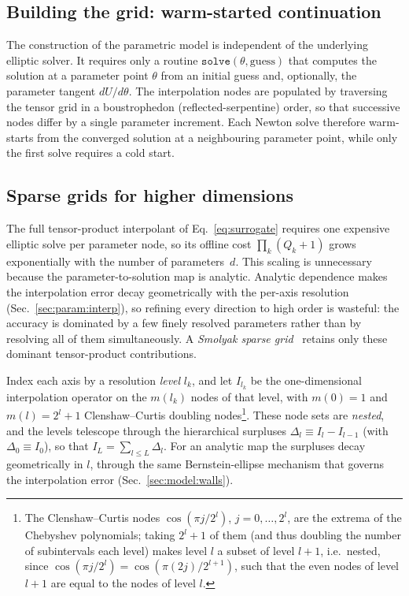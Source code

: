 \documentclass[
  aps,
  prd,
  twocolumn,
  amsmath,
  amssymb,
  nofootinbib,
  superscriptaddress,
  floatfix,
]{revtex4-2}
\begin{document}
\subsection{Building the grid: warm-started continuation}
\label{sec:param:build}
The construction of the parametric model is independent of the underlying
elliptic solver. It requires only a routine
$\texttt{solve}(\theta,\mathrm{guess})$ that computes the solution at a
parameter point $\theta$ from an initial guess and, optionally, the parameter
tangent $dU/d\theta$. The interpolation nodes are populated by traversing the
tensor grid in a boustrophedon (reflected-serpentine) order, so that successive
nodes differ by a single parameter increment. Each Newton solve therefore
warm-starts from the converged solution at a neighbouring parameter point,
while only the first solve requires a cold start.


\subsection{Sparse grids for higher dimensions}
\label{sec:param:smolyak}

The full tensor-product interpolant of Eq.~\eqref{eq:surrogate} requires one
expensive elliptic solve per parameter node, so its offline cost $\prod_k(Q_k{+}1)$
grows exponentially with the number of parameters~$d$. This scaling is unnecessary
because the parameter-to-solution map is analytic. Analytic dependence makes the
interpolation error decay geometrically with the per-axis resolution
(Sec.~\ref{sec:param:interp}), so refining every direction to high order is
wasteful: the accuracy is dominated by a few finely resolved parameters rather than
by resolving all of them simultaneously. A \emph{Smolyak sparse
grid}~\cite{Smolyak1963,NobileTemponeWebster2008} retains only these dominant
tensor-product contributions.

Index each axis by a resolution \emph{level} $l_k$, and let $I_{l_k}$ be the
one-dimensional interpolation operator on the $m(l_k)$ nodes of that level, with
$m(0)=1$ and $m(l)=2^{l}+1$
Clenshaw--Curtis doubling nodes\footnote{The Clenshaw--Curtis nodes $\cos(\pi j/2^{l})$, $j=0,\dots,2^{l}$, are the extrema of the Chebyshev polynomials; taking $2^{l}{+}1$ of them (and thus doubling the number of subintervals each level) makes level $l$ a subset of level $l{+}1$, i.e.\ nested, since $\cos(\pi j/2^{l})=\cos(\pi(2j)/2^{l+1})$, such that the even nodes of level  $l{+}1$ are equal to the nodes of level $l$.}. These node sets are \emph{nested}, and the
levels telescope through the hierarchical surpluses
$\Delta_{l}\equiv I_{l}-I_{l-1}$ (with $\Delta_0\equiv I_0$), so that
$I_{L}=\sum_{l\le L}\Delta_{l}$. For an analytic map the surpluses decay
geometrically in $l$, through the same Bernstein-ellipse mechanism that governs the
interpolation error (Sec.~\ref{sec:model:walls}).
\end{document}
